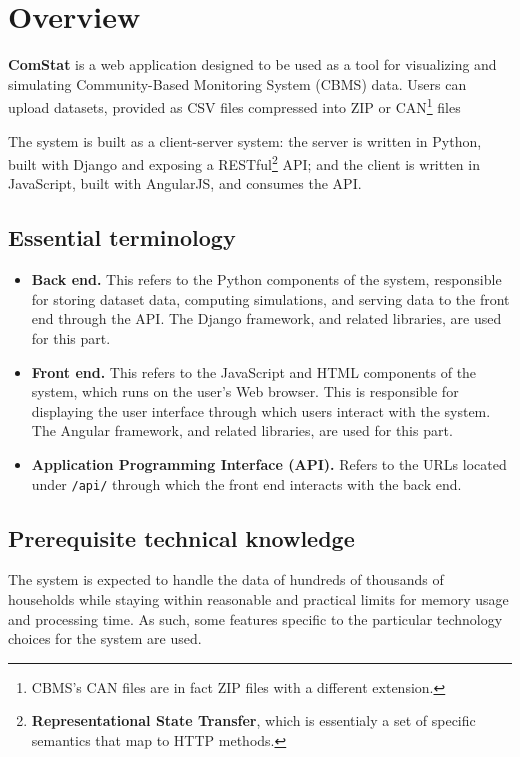 
\section{Overview}

\textbf{ComStat} is a web application designed to be used as a tool for visualizing and simulating Community-Based Monitoring System (CBMS) data. Users can upload datasets, provided as CSV files compressed into ZIP or
CAN\footnote{CBMS's CAN files are in fact ZIP files with a different extension.}
files

The system is built as a client-server system: the server is written in Python, built with Django and exposing a
RESTful\footnote{\textbf{Representational State Transfer}, which is essentialy a set of specific semantics that map to HTTP methods.}
API; and the client is written in JavaScript, built with AngularJS, and consumes the API.


\subsection{Essential terminology}

\begin{itemize}
    \item \textbf{Back end.} This refers to the Python components of the system, responsible for storing dataset data, computing simulations, and serving data to the front end through the API. The Django framework, and related libraries, are used for this part.
    \item \textbf{Front end.} This refers to the JavaScript and HTML components of the system, which runs on the user's Web browser. This is responsible for displaying the user interface through which users interact with the system. The Angular framework, and related libraries, are used for this part.
    \item \textbf{Application Programming Interface (API).} Refers to the URLs located under \texttt{/api/} through which the front end interacts with the back end.
\end{itemize}


\subsection{Prerequisite technical knowledge}

The system is expected to handle the data of hundreds of thousands of households while staying within reasonable and practical limits for memory usage and processing time. As such, some features specific to the particular technology choices for the system are used.


